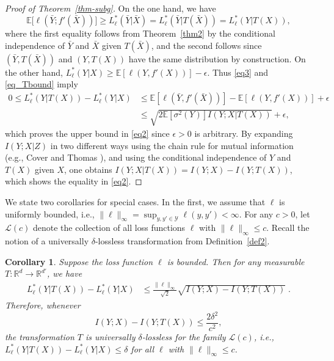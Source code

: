 \documentclass[11pt]{article}
\newtheorem{cor}{Corollary}
\def\R{{\mathbb R}}
\def\Y{\mathcal{Y}}
\def\L{\mathcal{L}}
\def\EXP {{\mathbb E}}
\begin{document}
\begin{proof}[Proof of Theorem~\ref{thm-subg}]
\noindent  On the one hand, we have 
\begin{equation}
\label{eq_Tbound}
   \EXP \big[ \ell(\bar{Y};f'(\bar{X}))\big]  \ge L_\ell^*(\bar{Y}|\bar{X})  
   = L_\ell^*(\bar{Y}|T(\bar{X}))   
   =  L_\ell^*(Y|T(X)), 
\end{equation}
where the first equality follows from Theorem~\ref{thm2} by the conditional independence of  $\bar{Y}$ and $\bar{X}$ given $T(\bar{X})$,   and the second follows since  $(\bar{Y},T(\bar{X})) $ and $(Y,T(X))$ have the same distribution by construction.  
 On the other hand, $L_\ell ^*(Y|X) \ge \EXP[\ell(Y,f'(X))] - \epsilon $. Thus 
\eqref{eq3} and \eqref{eq_Tbound} imply  
\begin{align*}
0\le   L_\ell^*(Y|T(X))-L_\ell^*(Y|X) 
&\le  \EXP [\ell(\bar{Y},f'(\bar{X}))] - \EXP [\ell(Y,f' (X))]  +\epsilon \\
&\le   \sqrt{2\EXP[\sigma^2(Y)]  I(Y;X|T(X))} +\epsilon,
\end{align*}
which  proves the  upper bound in \eqref{eq2}  since  $\epsilon>0 $ is
arbitrary. By expanding $I(Y;X|Z)$ in two different ways using the
chain rule for mutual information (e.g., Cover and Thomas \cite[Thm.~2.5.2]{CoTh06}), and using the conditional independence of
$Y$ and $T(X)$ given $X$, one obtains $I(Y;X|T(X))= I(Y;X)-I(Y;T(X))$,
which shows the equality in \eqref{eq2}.
\end{proof}


\vspace{1em}

We state two corollaries for 
special cases. In the first, we assume that  $\ell$ is
  uniformly bounded, i.e.,  $\|\ell\|_{\infty} = \sup_{y,y'\in \Y}
  \ell(y,y')<\infty$. For any $c>0$, let $\L(c)$ denote the collection of all loss functions $\ell$ with $\|\ell\|_{\infty} \le c$. Recall the notion  of a universally $\delta$-lossless transformation from Definition~\ref{def2}. 



\begin{cor}
  \label{cor1} Suppose the loss function $\ell$ is bounded. 
 Then  for any measurable  $T: \R^d\to \R^{d'}$,  we have  
\begin{eqnarray}
 L_\ell^*(Y|T(X))- L_\ell^*(Y|X)  & \le  \frac{\|\ell\|_{\infty}}{\sqrt{2}} \sqrt{
  I(Y;X)-I(Y;T(X))}\; .       \label{eq1}        
\end{eqnarray}
Therefore, whenever 
\begin{equation}
 \label{eq-ulosless1}   
  I(Y;X)-I(Y;T(X)) \le \frac{2\delta^2}{c^2},
\end{equation}
the transformation  $T$ is universally $\delta$-lossless  for the
family $\L(c)$,  i.e., $ L_\ell^*(Y|T(X))- L_\ell^*(Y|X) \le \delta $ for all $\ell$ with  $\|\ell\|_{\infty} \le c$.


\end{cor}
\end{document}
